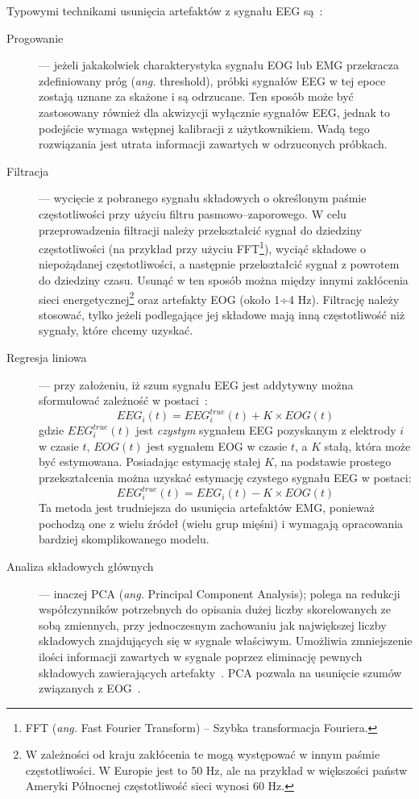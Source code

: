 \documentclass[skorowidz,skroty]{dyplomWEZUT}
\begin{document}
Typowymi technikami usunięcia artefaktów z sygnału EEG są~\cite{bci_introduction}:
\begin{description}
    \item [Progowanie] --- jeżeli jakakolwiek charakterystyka sygnału EOG lub EMG przekracza zdefiniowany próg (\textit{ang.} threshold), próbki sygnałów EEG w tej epoce zostają uznane za skażone i są odrzucane. Ten sposób może być zastosowany również dla akwizycji wyłącznie sygnałów EEG, jednak to podejście wymaga wstępnej kalibracji z użytkownikiem. Wadą tego rozwiązania jest utrata informacji zawartych w odrzuconych próbkach.
    
    \item [Filtracja] --- wycięcie z pobranego sygnału składowych o określonym paśmie częstotliwości przy użyciu filtru pasmowo--zaporowego. W celu przeprowadzenia filtracji należy przekształcić sygnał do dziedziny częstotliwości (na przykład przy użyciu FFT\footnote{FFT (\textit{ang.} Fast Fourier Transform) -- Szybka transformacja Fouriera.}), wyciąć składowe o niepożądanej częstotliwości, a następnie przekształcić sygnał z powrotem do dziedziny czasu. Usunąć w ten sposób można między innymi zakłócenia sieci energetycznej\footnote{W zależności od kraju zakłócenia te mogą występować w innym paśmie częstotliwości. W Europie jest to 50 Hz, ale na przykład w większości państw Ameryki Północnej częstotliwość sieci wynosi 60 Hz.} oraz artefakty EOG (około 1÷4 Hz). Filtrację należy stosować, tylko jeżeli podlegające jej składowe mają inną częstotliwość niż sygnały, które chcemy uzyskać.
    
    \item [Regresja liniowa] --- przy założeniu, iż szum sygnału EEG jest addytywny można sformułować zależność w postaci~\cite{bci_introduction}:
    $$ EEG_i(t) = EEG^{true}_i(t) + K \times EOG(t) $$
    gdzie $EEG^{true}_i(t)$ jest \textit{czystym} sygnałem EEG pozyskanym z elektrody $i$ w czasie $t$, $EOG(t)$ jest sygnałem EOG w czasie $t$, a $K$ stałą, która może być estymowana. Posiadając estymację stałej $K$, na podstawie prostego przekształcenia można uzyskać estymację czystego sygnału EEG w postaci:
    $$ EEG^{true}_i(t) = EEG_i(t) - K \times EOG(t) $$
    Ta metoda jest trudniejsza do usunięcia artefaktów EMG, ponieważ pochodzą one z wielu źródeł (wielu grup mięśni) i wymagają opracowania bardziej skomplikowanego modelu.

    \item [Analiza składowych głównych] --- inaczej PCA (\textit{ang.} Principal Component Analysis); polega na redukcji współczynników potrzebnych do opisania dużej liczby skorelowanych ze sobą zmiennych, przy jednoczesnym zachowaniu jak największej liczby składowych znajdujących się w sygnale właściwym. Umożliwia zmniejszenie ilości informacji zawartych w sygnale poprzez eliminację pewnych składowych zawierających artefakty~\cite{eeg_noise}. PCA pozwala na usunięcie szumów związanych z EOG~\cite{bci_introduction}.
    

\end{description}
\end{document}
